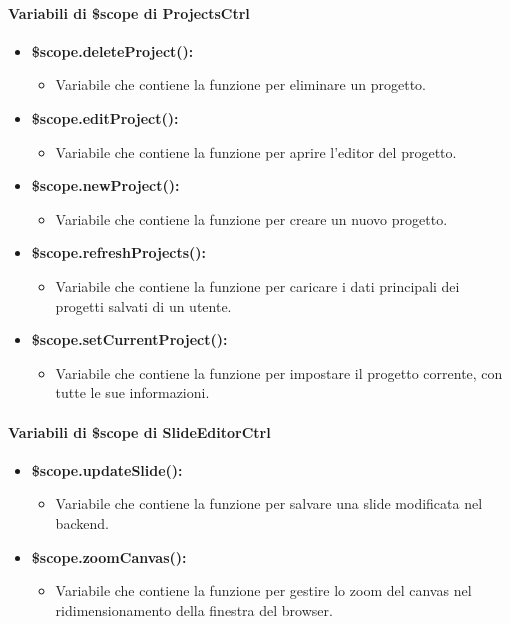 \paragraph{Variabili di \$scope di ProjectsCtrl}
\begin{itemize}
	\item \textbf{\$scope.deleteProject():}
	\begin{itemize}
		\item Variabile che contiene la funzione per eliminare un progetto.
	\end{itemize}

	\item \textbf{\$scope.editProject():}
	\begin{itemize}
		\item Variabile che contiene la funzione per aprire l'editor del progetto.
	\end{itemize}
	
	\item \textbf{\$scope.newProject():}
	\begin{itemize}
		\item Variabile che contiene la funzione per creare un nuovo progetto.
	\end{itemize}
	
	\item \textbf{\$scope.refreshProjects():}
	\begin{itemize}
		\item Variabile che contiene la funzione per caricare i dati principali dei progetti salvati di un utente.
	\end{itemize}
	
	\item \textbf{\$scope.setCurrentProject():}
	\begin{itemize}
		\item Variabile che contiene la funzione per impostare il progetto corrente, con tutte le sue informazioni.
	\end{itemize}
\end{itemize}


\paragraph{Variabili di \$scope di SlideEditorCtrl}
\begin{itemize}
	\item \textbf{\$scope.updateSlide():}
	\begin{itemize}
		\item Variabile che contiene la funzione per salvare una slide modificata nel backend.
	\end{itemize}
	
	\item \textbf{\$scope.zoomCanvas():}
	\begin{itemize}
		\item Variabile che contiene la funzione per gestire lo zoom del canvas nel ridimensionamento della finestra del browser.
	\end{itemize}
\end{itemize}